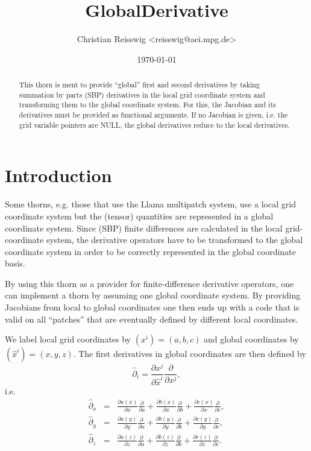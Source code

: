 \documentclass{article}
\begin{document}
\author{Christian Reisswig \textless reisswig@aei.mpg.de\textgreater}
\title{GlobalDerivative}

\date{\today}

\maketitle


\begin{abstract}
This thorn is ment to provide ``global'' first and second derivatives
by taking summation by parts (SBP) derivatives in the local grid coordinate system and transforming them
to the global coordinate system. For this, the Jacobian and its derivatives must be
provided as functional arguments. If no Jacobian is given, i.e. the grid variable
pointers are NULL, the global derivatives reduce to the local derivatives.
\end{abstract}

\section{Introduction}

Some thorns, e.g. those that use the Llama multipatch system, use a local grid coordinate system but the
(tensor) quantities are represented in a global coordinate system. Since (SBP) finite differences 
are calculated in the local grid-coordinate system, the derivative operators have to be
transformed to the global coordinate system in order to be correctly represented in
the global coordinate basis.

By using this thorn as a provider for finite-difference derivative operators, one can
implement a thorn by assuming one global coordinate system. By providing Jacobians
from local to global coordinates one then ends up with a code that is valid on all
``patches'' that are eventually defined by different local coordinates.


We label local grid coordinates by $(x^i) = (a,b,c)$ and global coordinates by $(\hat{x}^i) = (x,y,z)$.
The first derivatives in global coordinates are then defined by   
\begin{equation}
\hat{\partial}_i = \frac{\partial x^j}{\partial \hat{x}^i}\frac{\partial}{\partial x^j},
\end{equation}
i.e.
\begin{eqnarray}
\hat\partial_x &=& \frac{\partial a(x)}{\partial x}\frac{\partial}{\partial a} + \frac{\partial b(x)}{\partial x}\frac{\partial}{\partial b} + \frac{\partial c(x)}{\partial x}\frac{\partial}{\partial c}, \\
\hat\partial_y &=& \frac{\partial a(y)}{\partial y}\frac{\partial}{\partial a} + \frac{\partial b(y)}{\partial y}\frac{\partial}{\partial b} + \frac{\partial c(y)}{\partial y}\frac{\partial}{\partial c}, \\
\hat\partial_z &=& \frac{\partial a(z)}{\partial z}\frac{\partial}{\partial a} + \frac{\partial b(z)}{\partial z}\frac{\partial}{\partial b} + \frac{\partial c(z)}{\partial z}\frac{\partial}{\partial c}.
\end{eqnarray}
\end{document}
